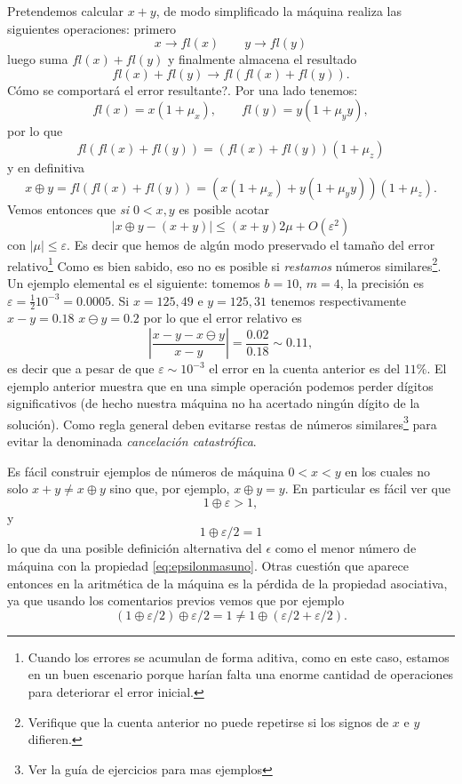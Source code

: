 Pretendemos calcular $x+y$, de modo simplificado la máquina realiza las siguientes operaciones: primero
$$
x\to fl(x) \qquad y\to fl(y)
$$
luego suma $fl(x)+fl(y)$ y finalmente almacena el resultado
$$
fl(x)+fl(y)\to fl(fl(x)+fl(y)).
$$
Cómo se comportará el error resultante?.
Por una lado tenemos:
$$fl(x)=x(1+\mu_x),\qquad  fl(y)=y(1+\mu_y
y),$$ por lo que
$$fl(fl(x)+fl(y))=(fl(x)+fl(y))(1+\mu_z)$$
y en definitiva
$$
x\oplus y =fl(fl(x)+fl(y))=(x(1+\mu_x)+y(1+\mu_y
y))(1+\mu_z).
$$
Vemos entonces que \emph{si $0<x,y$} es posible acotar
$$
|x\oplus y -(x+y)|\le (x+y)2\mu +O(\varepsilon^2)
$$
con $|\mu|\le \varepsilon$. Es decir que hemos de algún modo preservado el tamaño del error relativo\footnote{Cuando los errores se acumulan de forma aditiva, como en este caso, estamos en un buen escenario porque harían falta una enorme cantidad de operaciones para deteriorar el error inicial.}  Como es  bien sabido, eso no es posible si \emph{restamos}
números similares\footnote{Verifique que la cuenta anterior no puede repetirse si los signos de $x$ e $y$ difieren.}.
Un ejemplo elemental es el siguiente: tomemos $b=10$, $m=4$, la precisión es $\varepsilon=\frac{1}{2}10^{-3}=0.0005$. Si $x=125,49$ e $y=125,31$ tenemos respectivamente
$x-y=0.18$
$x\ominus y=0.2$ por lo que el error relativo es
$$
|\frac{x-y-x\ominus y}{x-y}|=\frac{0.02}{0.18}\sim 0.11,
$$
es decir que a pesar de que $\varepsilon \sim 10^{-3}$ el error en la cuenta anterior es del $11\%$. El ejemplo anterior muestra que en una simple operación podemos perder dígitos significativos (de hecho nuestra máquina no ha acertado ningún dígito de la solución). Como regla general deben evitarse restas de números similares\footnote{Ver la guía de ejercicios para mas ejemplos} para evitar la denominada \emph{cancelación catastrófica}.

Es fácil construir ejemplos de números de máquina $0<x<y$ en los cuales no solo $x+y\neq x\oplus y$ sino que, por ejemplo, $x\oplus y=y$. En particular es fácil ver que
\begin{equation}
 \label{eq:epsilonmasuno}
 1 \oplus\varepsilon> 1,
\end{equation}
y
$$
1\oplus\varepsilon/2=1
$$
lo que da una posible definición alternativa del $\epsilon$ como el menor número de máquina con la  propiedad \eqref{eq:epsilonmasuno}.
Otras cuestión que aparece entonces en la aritmética de la máquina es la pérdida de la propiedad asociativa, ya que usando los comentarios previos vemos que por ejemplo
$$
(1\oplus \varepsilon/2)\oplus \varepsilon/2=1\neq 1\oplus (\varepsilon/2+\varepsilon/2).
$$

